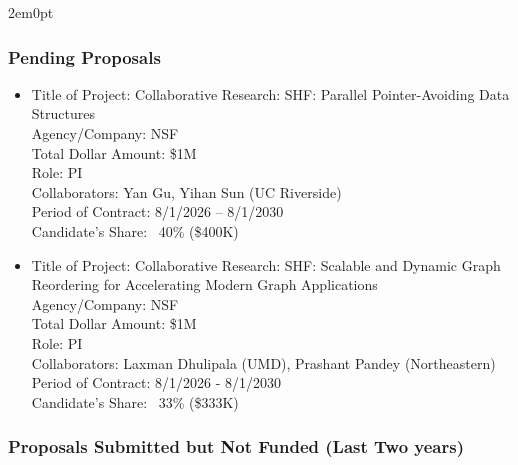 \begin{adjustwidth}{2em}{0pt}
\iffalse
\subsubsection{Pending Proposals}

\begin{itemize}
    \item
    Title of Project: Collaborative Research: SHF: Parallel Pointer-Avoiding Data Structures \\
    Agency/Company: NSF \\
    Total Dollar Amount: \$1M \\
    Role: PI \\
    Collaborators: Yan Gu, Yihan Sun (UC Riverside) \\
    Period of Contract: 8/1/2026 – 8/1/2030 \\
    Candidate’s Share: ~40\% (\$400K)
    \item
    Title of Project: Collaborative Research: SHF: Scalable and Dynamic Graph Reordering
for Accelerating Modern Graph Applications \\
    Agency/Company: NSF \\
    Total Dollar Amount: \$1M \\
    Role: PI \\
    Collaborators: Laxman Dhulipala (UMD), Prashant Pandey (Northeastern) \\
    Period of Contract: 8/1/2026 - 8/1/2030 \\
    Candidate’s Share: ~33\% (\$333K)

\end{itemize}

\subsubsection{Proposals Submitted but Not Funded (Last Two years)}


\end{adjustwidth}
